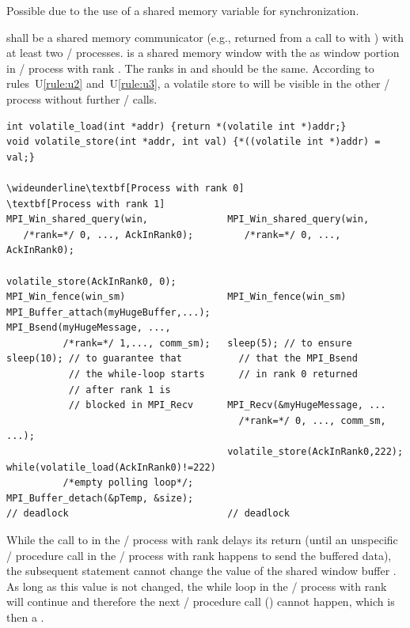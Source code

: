 \begin{example}
% 
\label{exa:sync-shared:deadlock}
Possible  due to the use of a shared memory variable for synchronization.

 shall be a shared memory communicator (e.g., returned from a call to
 with \mpicode{=})  
with at least two \MPI/ processes.
 is a shared memory window with the  as
window portion in \MPI/ process with rank .
The ranks in  and  should be the same.
According to  rules~U\ref{rule:u2} and~U\ref{rule:u3},
a volatile store to  will be visible in the
other \MPI/ process without further \RMA/ calls.

\begin{Verbatim}[commandchars=\\\[\]]
int volatile_load(int *addr) {return *(volatile int *)addr;}
void volatile_store(int *addr, int val) {*((volatile int *)addr) = val;}

\wideunderline\textbf[Process with rank 0]                    \textbf[Process with rank 1]
MPI_Win_shared_query(win,              MPI_Win_shared_query(win,
   /*rank=*/ 0, ..., AckInRank0);         /*rank=*/ 0, ..., AckInRank0);
                                        
volatile_store(AckInRank0, 0);
MPI_Win_fence(win_sm)                  MPI_Win_fence(win_sm)
MPI_Buffer_attach(myHugeBuffer,...);
MPI_Bsend(myHugeMessage, ...,
          /*rank=*/ 1,..., comm_sm);   sleep(5); // to ensure
sleep(10); // to guarantee that          // that the MPI_Bsend
           // the while-loop starts      // in rank 0 returned
           // after rank 1 is
           // blocked in MPI_Recv      MPI_Recv(&myHugeMessage, ...                   
                                         /*rank=*/ 0, ..., comm_sm, ...);
                                       volatile_store(AckInRank0,222);
while(volatile_load(AckInRank0)!=222) 
          /*empty polling loop*/;
MPI_Buffer_detach(&pTemp, &size);
// deadlock                            // deadlock
\end{Verbatim}
\lstset{fancyvrb=false}

While the call to  in the \MPI/ process with rank  delays its return
(until an unspecific \MPI/ procedure call in the \MPI/ process with rank  happens to send
the buffered data), the subsequent statement cannot change the value of the
shared window buffer .
As long as this value is not changed, the while loop in the \MPI/ process with rank 
will continue and therefore the next \MPI/ procedure call
() cannot happen, which is then a .
\end{example}

